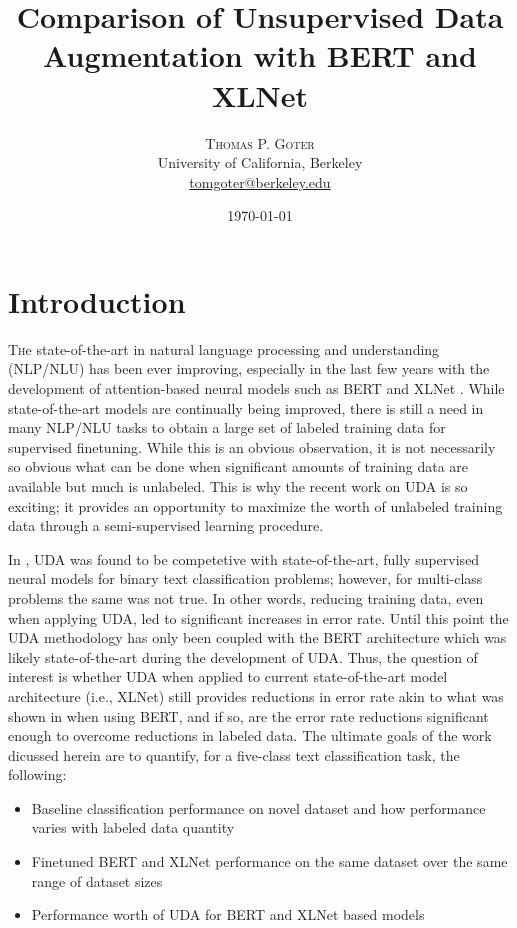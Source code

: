 \documentclass[twoside,twocolumn,10pt]{article}
\title{Comparison of Unsupervised Data Augmentation with BERT and XLNet} %
\author{%
\textsc{Thomas P. Goter} \\[1ex] %
\normalsize University of California, Berkeley \\ %
\normalsize \href{mailto:tomgoter@berkeley.edu}{tomgoter@berkeley.edu} %
}
\date{\today} %
\begin{document}
\maketitle


\section{Introduction} \label{introduction}

\lettrine[nindent=0em,lines=3]{T} he state-of-the-art in natural language processing and understanding (NLP/NLU) has been ever improving, especially in the last few years with the development of attention-based neural models \cite{Vaswani:2017} such as BERT \cite{Devlin:2019} and XLNet \cite{Yang:2019}.  While state-of-the-art models are continually being improved, there is still a need in many NLP/NLU tasks to obtain a large set of labeled training data for supervised finetuning.  While this is an obvious observation, it is not necessarily so obvious what can be done when significant amounts of training data are available but much is unlabeled.  This is why the recent work on UDA \cite{Xie:2019} is so exciting; it provides an opportunity to maximize the worth of unlabeled training data through a semi-supervised learning procedure.

In \cite{Xie:2019}, UDA was found to be competetive with state-of-the-art, fully supervised neural models for binary text classification problems; however, for multi-class problems the same was not true.  In other words, reducing training data, even when applying UDA, led to significant increases in error rate. Until this point the UDA methodology has only been coupled with the BERT architecture which was likely state-of-the-art during the development of UDA. Thus, the question of interest is whether UDA when applied to current state-of-the-art model architecture (i.e., XLNet) still provides reductions in error rate akin to what was shown in \cite{Xie:2019} when using BERT, and if so, are the error rate reductions significant enough to overcome reductions in labeled data. The ultimate goals of the work dicussed herein are to quantify, for a five-class text classification task, the following:
\begin{itemize}
	\item Baseline classification performance on novel dataset and how performance varies with labeled data quantity
	\item Finetuned BERT and XLNet performance on the same dataset over the same range of dataset sizes
	\item Performance worth of UDA for BERT and XLNet based models
\end{itemize}
\end{document}
